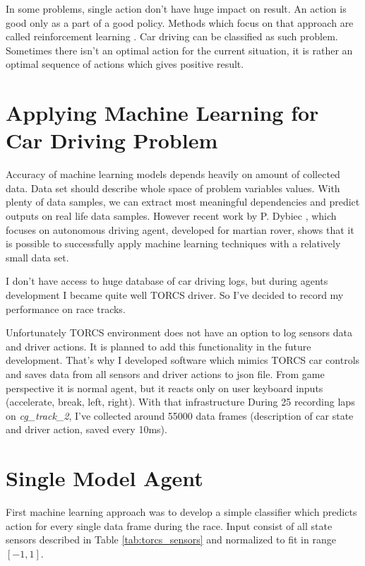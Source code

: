 \documentclass[declaration,shortabstract,english,inz]{iithesis}
\begin{document}
In some problems, single action don't have huge impact on result.
An action is good only as a part of a good policy.
Methods which focus on that approach are called reinforcement learning \cite{Introduction_ML}.
Car driving can be classified as such problem.
Sometimes there isn't an optimal action for the current situation, it is rather an optimal sequence of actions which gives positive result.


\section{Applying Machine Learning for Car Driving Problem}

Accuracy of machine learning models depends heavily on amount of collected data.
Data set should describe whole space of problem variables values.
With plenty of data samples, we can extract most meaningful dependencies and predict outputs on real life data samples.
However recent work by P. Dybiec \cite{rover}, which focuses on autonomous driving agent, developed for martian rover, shows that it is possible to successfully apply machine learning techniques with a relatively small data set.

  
I don't have access to huge database of car driving logs, but during agents development I became quite well TORCS driver.
So I've decided to record my performance on race tracks.

Unfortunately TORCS environment does not have an option to log sensors data and driver actions.
It is planned to add this functionality in the future development.
That's why I developed software which mimics TORCS car controls and saves data from all sensors and driver actions to json file.
From game perspective it is normal agent, but it reacts only on user keyboard inputs (accelerate, break, left, right).
 With that infrastructure During 25 recording laps on \textit{cg\_track\_2}, I've collected around 55000 data frames (description of car state and driver action, saved every 10ms).

\section{Single Model Agent}



First machine learning approach was to develop a simple classifier which predicts action for every single data frame during the race.
Input consist of all state sensors described  in Table \ref{tab:torcs_sensors} and normalized to fit in range $[-1,1]$.
\end{document}
